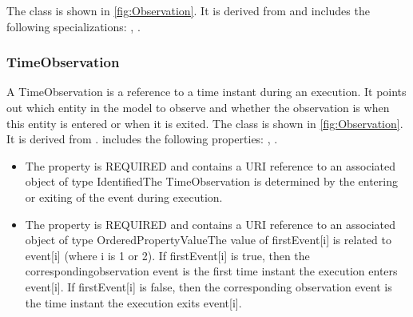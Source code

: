 %
The  class is shown in \ref{fig:Observation}. It is derived from  and includes the following specializations: , . %
%
\subsubsection{TimeObservation}%
\label{sec:uml:TimeObservation}%
A TimeObservation is a reference to a time instant during an execution. It points out which entity in the model to observe and whether the observation is when this entity is entered or when it is exited.%
\linebreak%
\linebreak%
The  class is shown in \ref{fig:Observation}. It is derived from .%
 includes the following properties: , . %
\begin{itemize}%
\item%
The  property is REQUIRED and contains a URI reference to an associated object of type IdentifiedThe TimeObservation is determined by the entering or exiting of the event during execution.%
\item%
The  property is REQUIRED and contains a URI reference to an associated object of type OrderedPropertyValueThe value of firstEvent[i] is related to event[i] (where i is 1 or 2). If firstEvent[i] is true, then the correspondingobservation event is the first time instant the execution enters event[i]. If firstEvent[i] is false, then the corresponding observation event is the time instant the execution exits event[i].%
\end{itemize}%
